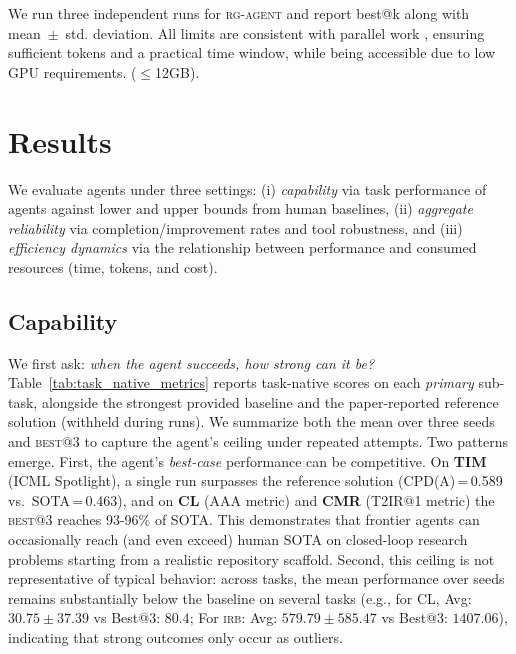 \documentclass[11pt]{article}
\let\cite\citep
\newcommand{\kw}[1]{{\textsc{\MakeLowercase{#1}}}}
\theoremstyle{plain}
\theoremstyle{definition}
\theoremstyle{remark}
\begin{document}
We run three independent runs for \kw{rg-agent} and report best@k along with mean~\(\pm\)~std. deviation. All limits are consistent with parallel work \cite{starace2025paperbench, chan2025mlebench, wu2025innovatorbenchevaluatingagentsability, nathani2025mlgymnewframeworkbenchmark}, ensuring sufficient tokens and a practical time window, while being accessible due to low GPU requirements. ($\leq$12GB). 

\section{Results} \label{results}

We evaluate agents under three settings: (i) \emph{capability} via task performance of agents against lower and upper bounds from human baselines, (ii) \emph{aggregate reliability} via completion/improvement rates and tool robustness, and (iii) \emph{efficiency dynamics} via the relationship between performance and consumed resources (time, tokens, and cost).

\subsection{Capability} \label{sec:results_capability}

We first ask: \emph{when the agent succeeds, how strong can it be?} Table~\ref{tab:task_native_metrics} reports task-native scores on each \emph{primary} sub-task, 
alongside the strongest provided baseline and the paper-reported reference solution (withheld during runs). We summarize both the mean over three seeds and \kw{Best@3} to capture the agent’s ceiling under repeated attempts.
Two patterns emerge. 
First, the agent's \emph{best-case} performance can be competitive. 
On \textbf{TIM} (ICML Spotlight), a single run
  surpasses the reference solution (CPD(A)\,=\,0.589 vs.\ SOTA\,=\,0.463), and on \textbf{CL} (AAA metric) and \textbf{CMR} (T2IR@1 metric) the
  \kw{Best@3} reaches 93-96\% of SOTA.
This demonstrates that frontier agents can occasionally reach (and even exceed) human SOTA on closed-loop research problems starting from a realistic repository scaffold. 
Second, this ceiling is not representative of typical behavior: across tasks, the mean performance over seeds remains substantially below the baseline on several tasks (e.g., for CL, Avg: $30.75 \pm 37.39$ vs Best@3: $80.4$; For \kw{IRB}: Avg: $579.79 \pm 585.47$ vs Best@3: $1407.06$), indicating that strong outcomes only occur as outliers.
\end{document}
